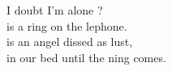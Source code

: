  I doubt  I'm alone ? \\
 is a ring on the lephone. \\
 is an angel dissed as lust, \\
 in our bed until the ning comes. \\

